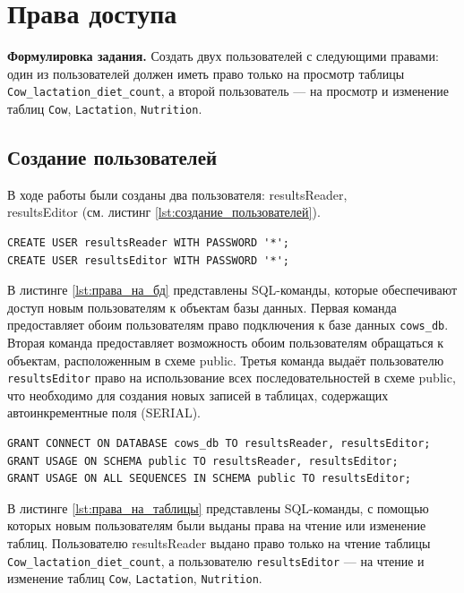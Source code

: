 

\section{Права доступа}
\textbf{Формулировка задания.}
Создать двух пользователей с следующими правами:
один из пользователей должен иметь право только на просмотр таблицы
\texttt{Cow\_lactation\_diet\_count}, а второй пользователь ---
на просмотр и изменение
таблиц \texttt{Cow}, \texttt{Lactation}, \texttt{Nutrition}.

\subsection{Создание пользователей}

В ходе работы были созданы два пользователя: resultsReader,\\
resultsEditor
(см. листинг \ref{lst:создание_пользователей}).

\begin{lstlisting}[caption={Создание пользователей}, label={lst:создание_пользователей}]
CREATE USER resultsReader WITH PASSWORD '*';
CREATE USER resultsEditor WITH PASSWORD '*';
\end{lstlisting}

В листинге \ref{lst:права_на_бд} представлены SQL-команды,
которые обеспечивают доступ новым пользователям к объектам базы данных.
Первая команда предоставляет обоим пользователям право подключения
к базе данных \texttt{cows\_db}.
Вторая команда предоставляет возможность обоим пользователям
обращаться к объектам, расположенным в схеме public.
Третья команда выдаёт пользователю \texttt{resultsEditor} право на
использование всех последовательностей в схеме public,
что необходимо для создания новых записей в таблицах,
содержащих автоинкрементные поля (SERIAL).

\begin{lstlisting}[caption={Общие права на базу данных}, label={lst:права_на_бд}]
GRANT CONNECT ON DATABASE cows_db TO resultsReader, resultsEditor;
GRANT USAGE ON SCHEMA public TO resultsReader, resultsEditor;
GRANT USAGE ON ALL SEQUENCES IN SCHEMA public TO resultsEditor;
\end{lstlisting}

В листинге \ref{lst:права_на_таблицы} представлены SQL-команды,
с помощью которых новым пользователям были выданы права на чтение или изменение
таблиц. Пользователю resultsReader выдано право только на чтение таблицы
\texttt{Cow\_lactation\_diet\_count}, а пользователю \texttt{resultsEditor} ---
на чтение и изменение таблиц \texttt{Cow}, \texttt{Lactation}, \texttt{Nutrition}.

